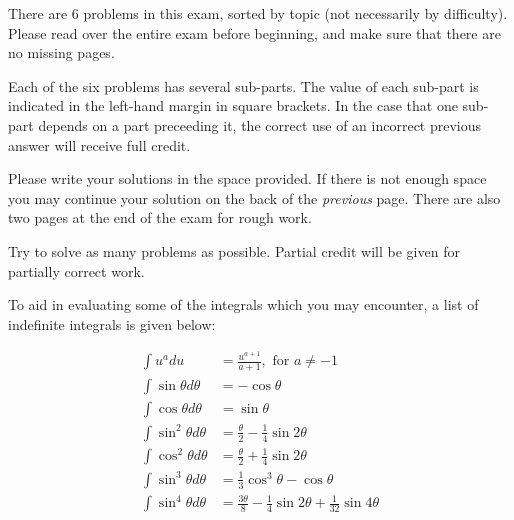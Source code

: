 \documentclass[12pt]{article}
\newcommand{\skipline}{\vspace{12pt}}
\begin{document}
\newpage
{}

 There are 6 problems in this exam, sorted by 
topic (not necessarily by difficulty).  Please read over the entire exam 
before beginning, and make sure that there are no missing pages.

Each of the six problems has several sub-parts.  The value of each 
sub-part is indicated in the left-hand margin in square brackets.
In the case that one sub-part depends on a part preceeding it, the correct 
use of an incorrect previous answer will receive full credit.

Please write your solutions in the space provided.  If there is not enough 
space you may continue your solution on the back of the {\em previous} 
page.  There are also two pages at the end of the exam for rough work.

Try to solve as many problems as possible.  Partial credit will be given 
for partially correct work.

\skipline

To aid in evaluating some of the integrals which you may encounter, a list 
of indefinite integrals is given below:

\begin{align*}
\int u^a d u &= \frac{u^{a+1}}{a+1}, \mbox{ for } a\neq -1\\
\int \sin\theta d \theta &= -\cos \theta\\
\int \cos\theta d \theta &= \sin \theta\\
\int \sin^2\theta d \theta &= \frac{\theta}{2} - \frac{1}{4}\sin 2\theta\\
\int \cos^2\theta d \theta & = \frac{\theta}{2} + \frac{1}{4} \sin 
2\theta\\
\int \sin^3\theta d \theta & = \frac{1}{3}\cos^3 \theta -\cos \theta\\
\int \sin^4\theta d \theta &= \frac{3\theta}{8} - \frac{1}{4} \sin 2\theta 
+\frac{1}{32} \sin 4\theta
\end{align*}


\newpage
{}
\end{document}
